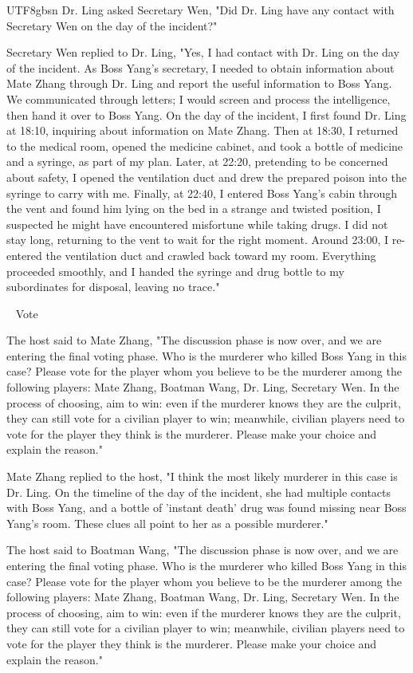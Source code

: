 \documentclass[11pt]{article}
\begin{document}
{\begin{CJK}{UTF8}{gbsn}
Dr. Ling asked Secretary Wen, "Did Dr. Ling have any contact with Secretary Wen on the day of the incident?"

Secretary Wen replied to Dr. Ling, "Yes, I had contact with Dr. Ling on the day of the incident. As Boss Yang's secretary, I needed to obtain information about Mate Zhang through Dr. Ling and report the useful information to Boss Yang. We communicated through letters; I would screen and process the intelligence, then hand it over to Boss Yang. On the day of the incident, I first found Dr. Ling at 18:10, inquiring about information on Mate Zhang. Then at 18:30, I returned to the medical room, opened the medicine cabinet, and took a bottle of medicine and a syringe, as part of my plan. Later, at 22:20, pretending to be concerned about safety, I opened the ventilation duct and drew the prepared poison into the syringe to carry with me. Finally, at 22:40, I entered Boss Yang's cabin through the vent and found him lying on the bed in a strange and twisted position, I suspected he might have encountered misfortune while taking drugs. I did not stay long, returning to the vent to wait for the right moment. Around 23:00, I re-entered the ventilation duct and crawled back toward my room. Everything proceeded smoothly, and I handed the syringe and drug bottle to my subordinates for disposal, leaving no trace."

\ \raisedrule[.5ex]{1pt} Vote \raisedrule[.5ex]{1pt} \ 

The host said to Mate Zhang, "The discussion phase is now over, and we are entering the final voting phase. Who is the murderer who killed Boss Yang in this case? Please vote for the player whom you believe to be the murderer among the following players: Mate Zhang, Boatman Wang, Dr. Ling, Secretary Wen. In the process of choosing, aim to win: even if the murderer knows they are the culprit, they can still vote for a civilian player to win; meanwhile, civilian players need to vote for the player they think is the murderer. Please make your choice and explain the reason."

Mate Zhang replied to the host, "I think the most likely murderer in this case is Dr. Ling. On the timeline of the day of the incident, she had multiple contacts with Boss Yang, and a bottle of 'instant death' drug was found missing near Boss Yang's room. These clues all point to her as a possible murderer."

The host said to Boatman Wang, "The discussion phase is now over, and we are entering the final voting phase. Who is the murderer who killed Boss Yang in this case? Please vote for the player whom you believe to be the murderer among the following players: Mate Zhang, Boatman Wang, Dr. Ling, Secretary Wen. In the process of choosing, aim to win: even if the murderer knows they are the culprit, they can still vote for a civilian player to win; meanwhile, civilian players need to vote for the player they think is the murderer. Please make your choice and explain the reason."


\end{CJK}}
\end{document}
